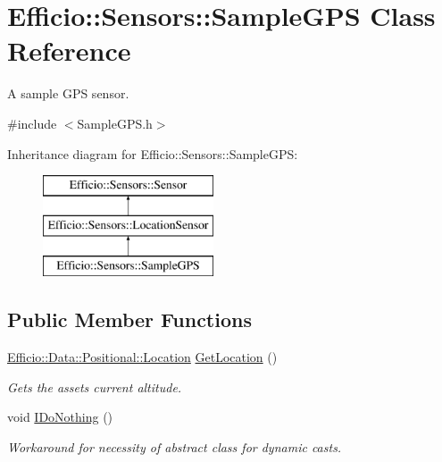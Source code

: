 \hypertarget{class_efficio_1_1_sensors_1_1_sample_g_p_s}{}\section{Efficio\+:\+:Sensors\+:\+:Sample\+G\+PS Class Reference}
\label{class_efficio_1_1_sensors_1_1_sample_g_p_s}


A sample G\+PS sensor.  




{\ttfamily \#include $<$Sample\+G\+P\+S.\+h$>$}

Inheritance diagram for Efficio\+:\+:Sensors\+:\+:Sample\+G\+PS\+:\begin{figure}[H]
\begin{center}
\leavevmode
\includegraphics[height=3.000000cm]{class_efficio_1_1_sensors_1_1_sample_g_p_s}
\end{center}
\end{figure}
\subsection*{Public Member Functions}
\begin{DoxyCompactItemize}
\item 
\hyperlink{class_efficio_1_1_data_1_1_positional_1_1_location}{Efficio\+::\+Data\+::\+Positional\+::\+Location} \hyperlink{class_efficio_1_1_sensors_1_1_sample_g_p_s_a14f4f8667e3062b49681ac0417703823}{Get\+Location} ()\hypertarget{class_efficio_1_1_sensors_1_1_sample_g_p_s_a14f4f8667e3062b49681ac0417703823}{}\label{class_efficio_1_1_sensors_1_1_sample_g_p_s_a14f4f8667e3062b49681ac0417703823}

\begin{DoxyCompactList}\small\item\em Gets the asset\textquotesingle{}s current altitude. \end{DoxyCompactList}\item 
void \hyperlink{class_efficio_1_1_sensors_1_1_sample_g_p_s_a6df872afc7df060ff99e1a7a53b53750}{I\+Do\+Nothing} ()\hypertarget{class_efficio_1_1_sensors_1_1_sample_g_p_s_a6df872afc7df060ff99e1a7a53b53750}{}\label{class_efficio_1_1_sensors_1_1_sample_g_p_s_a6df872afc7df060ff99e1a7a53b53750}

\begin{DoxyCompactList}\small\item\em Workaround for necessity of abstract class for dynamic casts. \end{DoxyCompactList}\end{DoxyCompactItemize}
